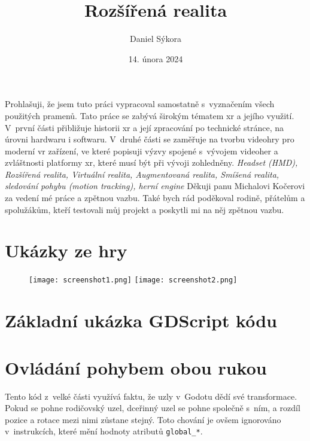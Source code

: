 \documentclass[12pt]{report}
\author{Daniel Sýkora}
\title{Rozšířená realita}
\date{14. února 2024}
\begin{document}
\mytitlepage
\prohlaseni
{
	Prohlašuji, že jsem tuto práci vypracoval samostatně s~vyznačením všech použitých pramenů.
}
\abstrakt
{ %
	Tato práce se zabývá širokým tématem \gls{xr} a jejího využití. V~první části přibližuje historii \gls{xr} a její zpracování po technické stránce, na úrovni hardwaru i softwaru. V~druhé části se zaměřuje na tvorbu videohry pro moderní \gls{vr} zařízení, ve které popisuji výzvy spojené s~vývojem videoher a zvláštnosti platformy \gls{xr}, které musí být při vývoji zohledněny.
}
{ %
	\textit{Headset (HMD), Rozšířená realita, Virtuální realita, Augmentovaná realita, Smíšená realita, sledování pohybu (motion tracking), herní engine}
}
\podekovani
{
	Děkuji panu Michalovi Kočerovi za vedení mé práce a zpětnou vazbu. Také bych rád poděkoval rodině, přátelům a spolužákům, kteří testovali můj projekt a poskytli mi na něj zpětnou vazbu.
}

\tableofcontents
\newpage






\nocite{*}

\printbibliography

\printglossary[title={Zkratky}]

\listoffigures
{}

\appendix

\chapter{Ukázky ze hry}\label{apx_screenshots}
\begin{figure}[H]
	\centering
	\texttt{[image: screenshot1.png]}
	\texttt{[image: screenshot2.png]}
\end{figure}

\chapter{Základní ukázka GDScript kódu}\label{apx_gscript_sample}


\chapter{Ovládání pohybem obou rukou}\label{apx_gripped_object_transformation}
Tento kód z~velké části využívá faktu, že uzly v~Godotu dědí své transformace. Pokud se pohne rodičovský uzel, dceřinný uzel se pohne společně s~ním, a rozdíl pozice a rotace mezi nimi zůstane stejný. Toto chování je ovšem ignorováno v~instrukcích, které mění hodnoty atributů \texttt{global\_*}.
\end{document}
